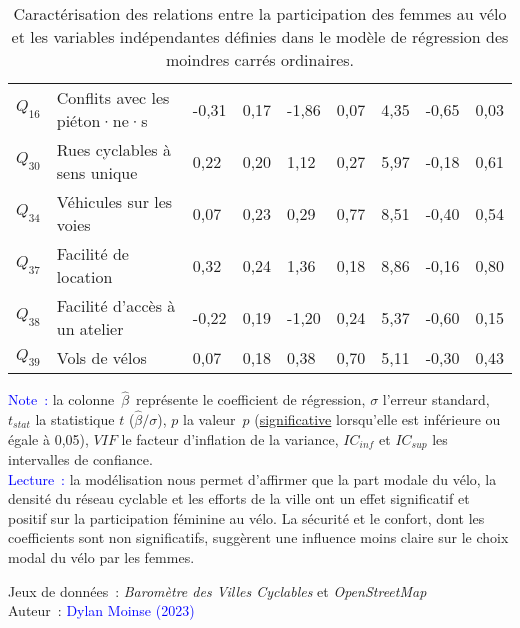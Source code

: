 \begin{table}[h!]
{\begin{tabular}{p{}p{}p{}p{}p{}p{}p{}p{}p{}}
\(Q_{16}\) & \small{Conflits avec les piéton·ne·s} & \small{-0,31} & \small{0,17} & \small{-1,86} & \small{0,07} & \small{4,35} & \small{-0,65} & \small{0,03} \\
\(Q_{30}\) & \small{Rues cyclables à sens unique} & \small{0,22} & \small{0,20} & \small{1,12} & \small{0,27} & \small{5,97} & \small{-0,18} & \small{0,61} \\
\(Q_{34}\) & \small{Véhicules sur les voies} & \small{0,07} & \small{0,23} & \small{0,29} & \small{0,77} & \small{8,51} & \small{-0,40} & \small{0,54} \\
\(Q_{37}\) & \small{Facilité de location} & \small{0,32} & \small{0,24} & \small{1,36} & \small{0,18} & \small{8,86} & \small{-0,16} & \small{0,80} \\
\(Q_{38}\) & \small{Facilité d'accès à un atelier} & \small{-0,22} & \small{0,19} & \small{-1,20} & \small{0,24} & \small{5,37} & \small{-0,60} & \small{0,15} \\
\(Q_{39}\) & \small{Vols de vélos} & \small{0,07} & \small{0,18} & \small{0,38} & \small{0,70} & \small{5,11} & \small{-0,30} & \small{0,43} \\
        \hline
        \end{tabular}}
    \caption{Caractérisation des relations entre la participation des femmes au vélo et les variables indépendantes définies dans le modèle de régression des moindres carrés ordinaires.}
    \label{table-chap4:regression-genre-barometre-fub}
        \vspace{5pt}
        \begin{flushleft}\scriptsize{
        \textcolor{blue}{Note~:} la colonne~$\hat{\beta}$~représente le coefficient de régression, $\sigma$ l'erreur standard, \(t_{stat}\) la statistique $t$ ($\hat{\beta}/\sigma$), $p$ la valeur~$p$ (\underline{significative} lorsqu'elle est inférieure ou égale à 0,05), \(VIF\) le facteur d'inflation de la variance, \(IC_{inf}\) et \(IC_{sup}\) les intervalles de confiance.
        \\
        \textcolor{blue}{Lecture~:} la modélisation nous permet d'affirmer que la part modale du vélo, la densité du réseau cyclable et les efforts de la ville ont un effet significatif et positif sur la participation féminine au vélo. La sécurité et le confort, dont les coefficients sont non significatifs, suggèrent une influence moins claire sur le choix modal du vélo par les femmes.
        }\end{flushleft}
        \begin{flushright}\scriptsize{
        Jeux de données~: \textsl{Baromètre des Villes Cyclables} \textcolor{blue}{\autocite{fub_barometre_2021}} et \textsl{OpenStreetMap} \textcolor{blue}{\autocite{openstreetmap_openstreetmap_2023}}
        \\
        Auteur~: \textcolor{blue}{Dylan Moinse (2023)}
        }\end{flushright}
        \end{table}